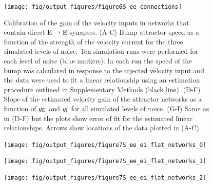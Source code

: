 \documentclass[a4paper,12pt]{article}
\newcommand{\ssc}[3]{\ensuremath{#1_{\text{#2}_{\text{#3}}}}}
\newcommand{\gE      }{\ssc{g}      {\scriptsize{E}}{}}
\newcommand{\gI      }{\ssc{g}      {\scriptsize{I}}{}}
\begin{document}
\clearpage

\begin{figure}[ht!]
    \internallinenumbers
    \centering
        \texttt{[image: fig/output\_figures/figure6S\_ee\_connections]}
    \caption{Calibration of the gain of the velocity inputs in networks that
    contain direct E$\rightarrow$E synapses. (A-C) Bump attractor speed as a
    function of the strength of the velocity current for the three simulated
    levels of noise. Ten simulation runs were performed for each level of noise
    (blue markers). In each run the speed of the bump was calculated in
    response to the injected velocity input and the data were used to fit a
    linear relationship using an estimation procedure outlined in Supplementary
    Methods (black line). (D-F) Slope of the estimated velocity gain of the
    attractor networks as a function of $\gE$ and $\gI$ for all simulated
    levels of noise. (G-I) Same as in (D-F) but the plots show error of fit for
    the estimated linear relationships. Arrows show locations of the data
    plotted in (A-C).}
\end{figure}

\clearpage

\begin{figure}[p!]
    \internallinenumbers
    \centering
        \texttt{[image: fig/output\_figures/figure7S\_ee\_ei\_flat\_networks\_0]}
\end{figure}

\clearpage

\begin{figure}[p!]
    \internallinenumbers
    \centering
        \texttt{[image: fig/output\_figures/figure7S\_ee\_ei\_flat\_networks\_1]}
\end{figure}

\begin{figure}[p!]
    \internallinenumbers
    \centering
        \texttt{[image: fig/output\_figures/figure7S\_ee\_ei\_flat\_networks\_2]}
\end{figure}

\clearpage

\begin{figure}[H]
    \internallinenumbers
    \caption{}
\end{figure}

\clearpage
\end{document}
